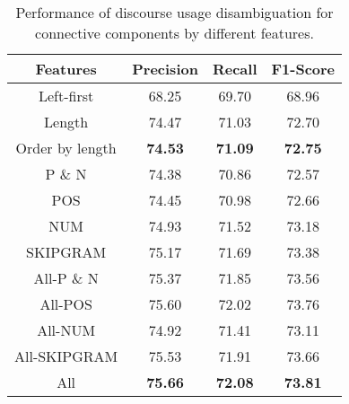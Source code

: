 \begin{table}[ht]
\centering
\begin{tabular}{|c|c|c|c|}
\hline

\bf Features            & \bf Precision & \bf Recall & \bf F1-Score \\ \hline
    Left-first          &     68.25     &     69.70  &     68.96    \\ \hline
    Length              &     74.47     &     71.03  &     72.70    \\ \hline
    Order by length     & \bf 74.53     & \bf 71.09  & \bf 72.75    \\

\hhline{|=|=|=|=|}


    P \& N              &     74.38     &     70.86  &     72.57    \\ \hline
    POS                 &     74.45     &     70.98  &     72.66    \\ \hline
    NUM                 &     74.93     &     71.52  &     73.18    \\ \hline
    SKIPGRAM            &     75.17     &     71.69  &     73.38    \\ \hline
    All-P \& N          &     75.37     &     71.85  &     73.56    \\ \hline
    All-POS             &     75.60     &     72.02  &     73.76    \\ \hline
    All-NUM             &     74.92     &     71.41  &     73.11    \\ \hline
    All-SKIPGRAM        &     75.53     &     71.91  &     73.66    \\ \hline
    All                 & \bf 75.66     & \bf 72.08  & \bf 73.81    \\ \hline

\end{tabular}
\caption{\label{t:pipeline-length} Performance of discourse usage
disambiguation for connective components by different features. }
\end{table}
